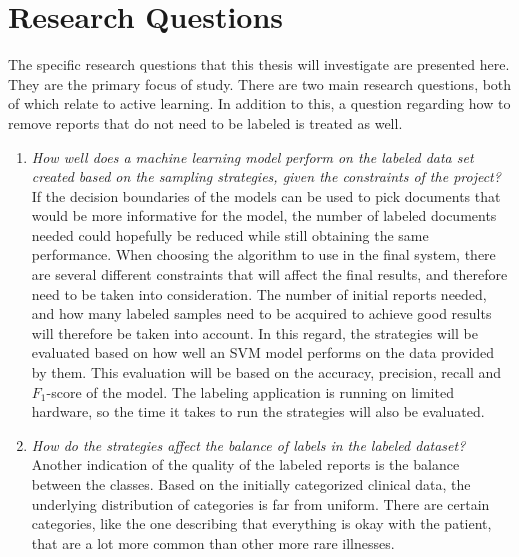 \section{Research Questions}
\label{sec:research-questions}

The specific research questions that this thesis will investigate are presented here.
They are the primary focus of study.
There are two main research questions, both of which relate to active learning.
In addition to this, a question regarding how to remove reports that do not need to be labeled is treated as well.

\begin{enumerate}
      \item \label{intro:re-q1} 
      \textit{How well does a machine learning model perform on the labeled data set created based on the sampling strategies, given the constraints of the project?}
      \newline
      If the decision boundaries of the models can be used to pick documents that would be more informative for the model, the number of labeled documents needed could hopefully be reduced while still obtaining the same performance.
      When choosing the algorithm to use in the final system, there are several different constraints that will affect the final results, and therefore need to be taken into consideration.
      The number of initial reports needed, and how many labeled samples need to be acquired to achieve good results will therefore be taken into account.
      In this regard, the strategies will be evaluated based on how well an SVM model performs on the data provided by them.
      This evaluation will be based on the accuracy, precision, recall and $F_1$-score of the model.
      The labeling application is running on limited hardware, so the time it takes to run the strategies will also be evaluated.

      \item \label{intro:re-q2}
      \textit{How do the strategies affect the balance of labels in the labeled dataset?}
      \newline
      Another indication of the quality of the labeled reports is the balance between the classes.
      Based on the initially categorized clinical data, the underlying distribution of categories is far from uniform.
      There are certain categories, like the one describing that everything is okay with the patient, that are a lot more common than other more rare illnesses.


\end{enumerate}
